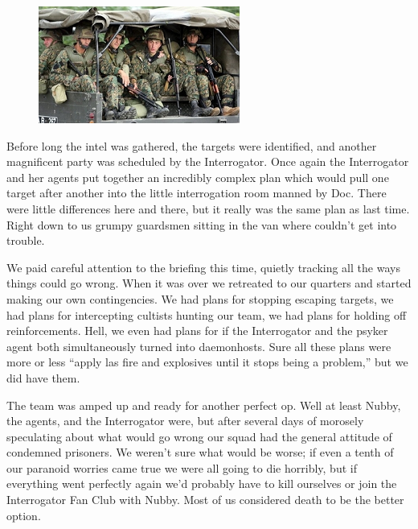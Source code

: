 \begin{figure}
	\begin{center}
		\includegraphics[width=\figwidth]{pics/5/11.png}
	\end{center}
\end{figure}
Before long the intel was gathered, the targets were identified, and another magnificent party was scheduled by the Interrogator.
Once again the Interrogator and her agents put together an incredibly complex plan which would pull one target after another into the little interrogation room manned by Doc. 
There were little differences here and there, but it really was the same plan as last time. 
Right down to us grumpy guardsmen sitting in the van where couldn’t get into trouble.

We paid careful attention to the briefing this time, quietly tracking all the ways things could go wrong. 
When it was over we retreated to our quarters and started making our own contingencies. 
We had plans for stopping escaping targets, we had plans for intercepting cultists hunting our team, we had plans for holding off reinforcements. 
Hell, we even had plans for if the Interrogator and the psyker agent both simultaneously turned into daemonhosts. 
Sure all these plans were more or less “apply las fire and explosives until it stops being a problem,” but we did have them.

The team was amped up and ready for another perfect op. 
Well at least Nubby, the agents, and the Interrogator were, but after several days of morosely speculating about what would go wrong our squad had the general attitude of condemned prisoners. 
We weren’t sure what would be worse; 
if even a tenth of our paranoid worries came true we were all going to die horribly, but if everything went perfectly again we’d probably have to kill ourselves or join the Interrogator Fan Club with Nubby. 
Most of us considered death to be the better option.

